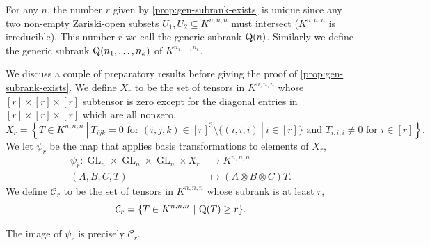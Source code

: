 \documentclass[11pt]{article}
\theoremstyle{definition}
\theoremstyle{remark}
\newcommand{\subrank}{{\rm Q}}
\newcommand{\GL}{\operatorname{GL}}
\begin{document}
For any $n$, the number $r$ given by \autoref{prop:gen-subrank-exists} is unique since any two non-empty Zariski-open subsets $U_1, U_2 \subseteq K^{n,n,n}$ must intersect ($K^{n,n,n}$ is irreducible). This number $r$ we call the generic subrank $\subrank(n)$. Similarly we define the generic subrank $\subrank(n_1, \ldots, n_k)$ of $K^{n_1, \ldots, n_k}$.

%
%

%


%
We discuss a couple of preparatory results before giving the proof of \autoref{prop:gen-subrank-exists}. We define $X_r$ to be the set of tensors in $K^{n,n,n}$ whose $[r]\times[r]\times[r]$ subtensor is zero except for the diagonal entries in $[r]\times [r]\times [r]$ which are all nonzero,
\[
X_r = \left\{T \in K^{n,n,n}\ | \ T_{ijk} = 0 \text{ for } (i,j,k) \in [r]^3 \setminus \{(i,i,i)\ |\ i \in [r]\} \text{ and } T_{i,i,i} \neq 0 \text{ for } i \in [r] \right\}.
\]
We let $\psi_r$ be the map that applies basis transformations to elements of $X_r$,
\begin{align*}
\psi_r: \GL_n \times \GL_n \times \GL_n \times X_r &\longrightarrow K^{n,n,n}\\
(A,B,C,T) & \longmapsto (A \otimes B \otimes C)T.
\end{align*}
%
We define $\mathcal{C}_r$ to be the set of tensors in $K^{n,n,n}$ whose subrank is at least $r$,
%
\[
\mathcal{C}_r = \{T \in K^{n,n,n}\ | \ \subrank(T) \geq r\}.
\]


\begin{lemma} \label{lem:Cr-as-image}
The image of $\psi_r$ is precisely $\mathcal{C}_r$.
\end{lemma}
\end{document}
